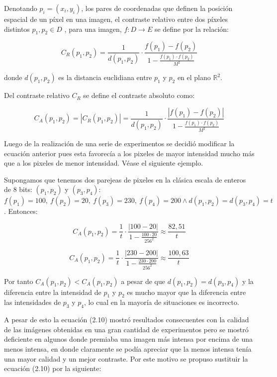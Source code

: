 Denotando $p_i =(x_i ,y_i )$, los pares de coordenadas que definen la posición espacial de un píxel en una imagen, el contraste relativo entre dos píxeles distintos $p_1 , p_2 \in D$ , para una imagen, $f : D \to E$ se define por la relación:

\begin{equation}
	C_R(p_1,p_2)=\frac{1}{d(p_1,p_2)}\cdot\frac{f(p_1)-f(p_2)}{1-\frac{f(p_1)\cdot f(p_2)}{M^2}}
\end{equation}

donde $d(p_1 ,p_2 )$ es la distancia euclidiana entre $p_1$ y $p_2$ en el plano $\mathbb{R}^2$.

Del contraste relativo $C_R$ se define el contraste absoluto como:

\begin{equation}
	C_A(p_1,p_2)=|C_R(p_1,p_2)|=\frac{1}{d(p_1,p_2)}\cdot\frac{|f(p_1)-f(p_2)|}{1-\frac{f(p_1)\cdot f(p_2)}{M^2}}
\end{equation}

Luego de la realizaci\'on de una serie de experimentos se decidi\'o modificar la ecuaci\'on anterior pues esta favorec\'ia a los pixeles de mayor intensidad mucho m\'as que a los pixeles de menor intensidad. V\'ease el siguiente ejemplo.

Supongamos que tenemos dos parejeas de pixeles en la cl\'asica escala de enteros de 8 bits: $(p_1,p_2)$ y $(p_3,p_4)$: $f(p_1)=100,~f(p_2)=20,~f(p_3)=230,~f(p_4)=200 \land d(p_1,p_2)=d(p_3,p_4)=t$. Entonces:

\begin{equation}
	C_A(p_1,p_2)=\frac{1}{t}\cdot\frac{|100-20|}{1-\frac{100\cdot20}{256^2}}\approx\frac{82,51}{t}
\end{equation} 

\begin{equation}
	C_A(p_1,p_2)=\frac{1}{t}\cdot\frac{|230-200|}{1-\frac{230\cdot200}{256^2}}\approx\frac{100,63}{t}
\end{equation}

Por tanto $C_A(p_1,p_2)<C_A(p_1,p_2)$ a pesar de que $d(p_1,p_2)=d(p_3,p_4)$ y la diferencia entre la intensidad de $p_1$ y $p_2$ es mucho mayor que la diferencia entre las intensidades de $p_3$ y $p_4$, lo cual en la mayor\'ia de situaciones es incorrecto.

A pesar de esto la ecuaci\'on (2.10) mostr\'o resultados consecuentes con la calidad de las im\'agenes obtenidas en una gran cantidad de experimentos pero se mostr\'o deficiente en algunos donde premiaba una imagen m\'as intensa por encima de una menos intensa, en donde claramente se pod\'ia apreciar que la menos intensa ten\'ia una mayor calidad y un mejor contraste. Por este motivo se propuso sustituir la ecuaci\'on (2.10) por la siguiente:


